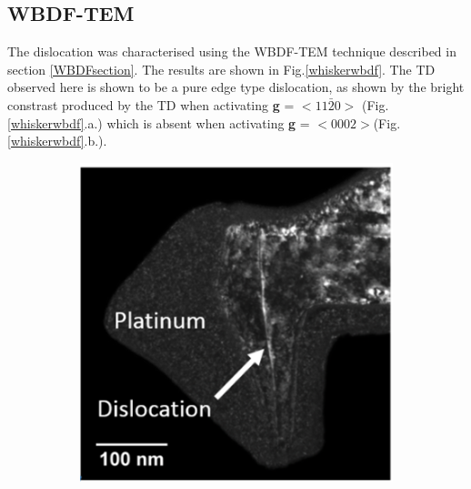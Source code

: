 \subsection{WBDF-TEM}

The dislocation was characterised using the WBDF-TEM technique described in section \ref{WBDFsection}. The results are shown in Fig.\ref{whiskerwbdf}. The TD observed here is shown to be a pure edge type dislocation, as shown by the bright constrast produced by the TD when activating \textbf{g} = $<11\bar{2}0>$ (Fig.\ref{whiskerwbdf}.a.) which is absent when activating \textbf{g} = $<0002>$(Fig.\ref{whiskerwbdf}.b.).

\begin{figure}[h]
	
	\begin{subfigure}[b]{0.48\textwidth}
		\centering
		\includegraphics[width=0.92\linewidth]{Figs/Ch4/1120}
		\caption{}
		

\end{subfigure}
\end{figure}
